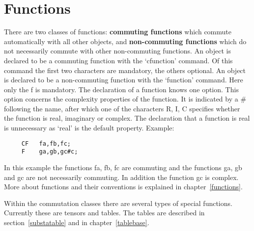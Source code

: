 \section{Functions}

\label{sect-functions}
There are two classes of functions: {\bf commuting 
functions} which commute automatically with all other objects, and {\bf 
non-commuting functions} which do not necessarily commute with other 
non-commuting functions. An object is declared to be a 
commuting function with the 
`cfunction' command. Of this command the first two characters are 
mandatory, the others optional. An object is declared to be a 
non-commuting function 
with the `function' command. Here only the f is mandatory. The declaration 
of a function knows one option. This option concerns the complexity 
properties of the function. It is indicated by a \# following the name, 
after which one of the characters R, I, C specifies whether the function is 
real, imaginary or complex. The 
declaration that a function is real is unnecessary as `real' is the default 
property. Example:
\begin{verbatim}
     CF   fa,fb,fc;
     F    ga,gb,gc#c;
\end{verbatim}
In this example the functions fa, fb, fc are commuting and the 
functions ga, gb and gc are not necessarily commuting. In addition the 
function gc is complex. More about functions and their conventions 
is explained in chapter~\ref{functions}.

Within the commutation classes there are several types of special 
functions. Currently these are tensors and 
tables. The tables are described in section~\ref{substatable} 
and in chapter~\ref{tablebase}.

